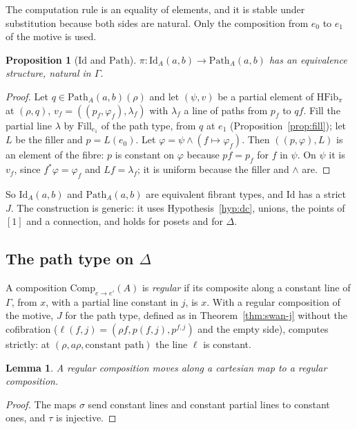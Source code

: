 \documentclass[11pt]{article}
\newcommand{\HFib}{\mathrm{HFib}}
\newcommand{\Comp}{\mathrm{Comp}}
\newcommand{\Path}{\mathrm{Path}}
\newcommand{\Id}{\mathrm{Id}}
\theoremstyle{plain}
\newtheorem{lemma}[theorem]{Lemma}
\newtheorem{proposition}[theorem]{Proposition}
\theoremstyle{definition}
\theoremstyle{remark}
\begin{document}
The computation rule is an equality of elements, and it is stable under
substitution because both sides are natural. Only the composition from
$e_0$ to $e_1$ of the motive is used.

\begin{proposition}[$\Id$ and $\Path$]\label{prop:id-path}
$\pi:\Id_A(a,b)\to\Path_A(a,b)$ has an equivalence structure, natural in
$\Gamma$.
\end{proposition}

\begin{proof}
Let $q\in\Path_A(a,b)(\rho)$ and let $(\psi,v)$ be a partial element of
$\HFib_\pi$ at $(\rho,q)$, $v_f=((p_f,\varphi_f),\lambda_f)$ with
$\lambda_f$ a line of paths from $p_f$ to $qf$. Fill the partial line
$\lambda$ by $\mathrm{Fill}_{e_1}$ of the path type, from $q$ at $e_1$
(Proposition~\ref{prop:fill}); let $L$ be the filler and $p=L(e_0)$. Let
$\varphi=\psi\wedge(f\mapsto\varphi_f)$. Then $((p,\varphi),L)$ is an
element of the fibre: $p$ is constant on $\varphi$ because $pf=p_f$ for
$f$ in $\psi$. On $\psi$ it is $v_f$, since $f^*\varphi=\varphi_f$ and
$Lf=\lambda_f$; it is uniform because the filler and $\wedge$ are.
\end{proof}

So $\Id_A(a,b)$ and $\Path_A(a,b)$ are equivalent fibrant types, and $\Id$
has a strict $J$. The construction is generic: it uses
Hypothesis~\ref{hyp:dc}, unions, the points of $[1]$ and a connection, and
holds for posets and for $\Delta$.

\subsection{The path type on $\Delta$}

A composition $\Comp_{e\to e'}(A)$ is \emph{regular} if its composite
along a constant line of $\Gamma$, from $x$, with a partial line constant
in $j$, is $x$. With a regular composition of the motive, $J$ for the path
type, defined as in Theorem~\ref{thm:swan-j} without the cofibration
($\ell(f,j)=(\rho f,p(f,j),p^{f,j})$ and the empty side), computes
strictly: at $(\rho,a\rho,\text{constant path})$ the line $\ell$ is
constant.

\begin{lemma}\label{lem:reg-move}
A regular composition moves along a cartesian map to a regular
composition.
\end{lemma}

\begin{proof}
The maps $\sigma$ send constant lines and constant partial lines to
constant ones, and $\tau$ is injective.
\end{proof}
\end{document}
